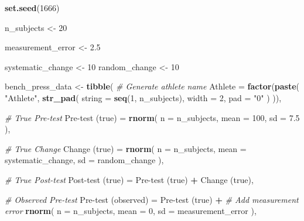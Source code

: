 \documentclass[
]{book}
\newenvironment{Shaded}{\begin{snugshade}}{\end{snugshade}}
\newcommand{\CommentTok}[1]{\textcolor[rgb]{0.56,0.35,0.01}{\textit{#1}}}
\newcommand{\DataTypeTok}[1]{\textcolor[rgb]{0.13,0.29,0.53}{#1}}
\newcommand{\DecValTok}[1]{\textcolor[rgb]{0.00,0.00,0.81}{#1}}
\newcommand{\FloatTok}[1]{\textcolor[rgb]{0.00,0.00,0.81}{#1}}
\newcommand{\KeywordTok}[1]{\textcolor[rgb]{0.13,0.29,0.53}{\textbf{#1}}}
\newcommand{\NormalTok}[1]{#1}
\newcommand{\OperatorTok}[1]{\textcolor[rgb]{0.81,0.36,0.00}{\textbf{#1}}}
\newcommand{\StringTok}[1]{\textcolor[rgb]{0.31,0.60,0.02}{#1}}
\begin{document}
\begin{Shaded}
\begin{Highlighting}[]
\KeywordTok{set.seed}\NormalTok{(}\DecValTok{1666}\NormalTok{)}

\NormalTok{n\_subjects <{-}}\StringTok{ }\DecValTok{20}

\NormalTok{measurement\_error <{-}}\StringTok{ }\FloatTok{2.5}

\NormalTok{systematic\_change <{-}}\StringTok{ }\DecValTok{10}
\NormalTok{random\_change <{-}}\StringTok{ }\DecValTok{10}

\NormalTok{bench\_press\_data <{-}}\StringTok{ }\KeywordTok{tibble}\NormalTok{(}
  \CommentTok{\# Generate athlete name}
  \DataTypeTok{Athlete =} \KeywordTok{factor}\NormalTok{(}\KeywordTok{paste}\NormalTok{(}
    \StringTok{"Athlete"}\NormalTok{,}
    \KeywordTok{str\_pad}\NormalTok{(}
      \DataTypeTok{string =} \KeywordTok{seq}\NormalTok{(}\DecValTok{1}\NormalTok{, n\_subjects),}
      \DataTypeTok{width =} \DecValTok{2}\NormalTok{,}
      \DataTypeTok{pad =} \StringTok{"0"}
\NormalTok{    )}
\NormalTok{  )),}

  \CommentTok{\# True Pre{-}test}
  \StringTok{\textasciigrave{}}\DataTypeTok{Pre{-}test (true)}\StringTok{\textasciigrave{}}\NormalTok{ =}\StringTok{ }\KeywordTok{rnorm}\NormalTok{(}
    \DataTypeTok{n =}\NormalTok{ n\_subjects,}
    \DataTypeTok{mean =} \DecValTok{100}\NormalTok{,}
    \DataTypeTok{sd =} \FloatTok{7.5}
\NormalTok{  ),}

  \CommentTok{\# True Change}
  \StringTok{\textasciigrave{}}\DataTypeTok{Change (true)}\StringTok{\textasciigrave{}}\NormalTok{ =}\StringTok{ }\KeywordTok{rnorm}\NormalTok{(}
    \DataTypeTok{n =}\NormalTok{ n\_subjects,}
    \DataTypeTok{mean =}\NormalTok{ systematic\_change,}
    \DataTypeTok{sd =}\NormalTok{ random\_change}
\NormalTok{  ),}

  \CommentTok{\# True Post{-}test}
  \StringTok{\textasciigrave{}}\DataTypeTok{Post{-}test (true)}\StringTok{\textasciigrave{}}\NormalTok{ =}\StringTok{ \textasciigrave{}}\DataTypeTok{Pre{-}test (true)}\StringTok{\textasciigrave{}} \OperatorTok{+}\StringTok{ \textasciigrave{}}\DataTypeTok{Change (true)}\StringTok{\textasciigrave{}}\NormalTok{,}

  \CommentTok{\# Observed Pre{-}test}
  \StringTok{\textasciigrave{}}\DataTypeTok{Pre{-}test (observed)}\StringTok{\textasciigrave{}}\NormalTok{ =}\StringTok{ \textasciigrave{}}\DataTypeTok{Pre{-}test (true)}\StringTok{\textasciigrave{}} \OperatorTok{+}
\StringTok{    }\CommentTok{\# Add measurement error}
\StringTok{    }\KeywordTok{rnorm}\NormalTok{(}
      \DataTypeTok{n =}\NormalTok{ n\_subjects,}
      \DataTypeTok{mean =} \DecValTok{0}\NormalTok{,}
      \DataTypeTok{sd =}\NormalTok{ measurement\_error}
\NormalTok{    ),}


\end{Highlighting}
\end{Shaded}
\end{document}

